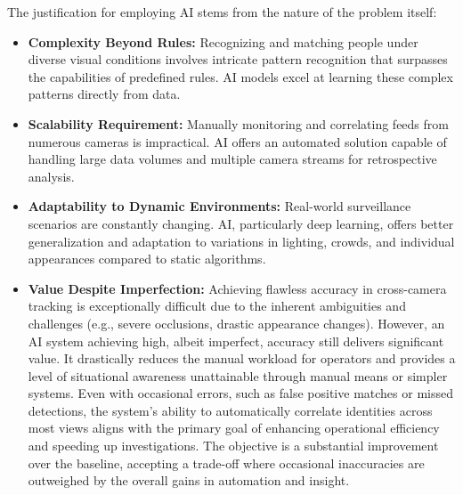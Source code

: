 \clearpage %
The justification for employing AI stems from the nature of the problem itself:
\begin{itemize}
    \item \textbf{Complexity Beyond Rules:} Recognizing and matching people under diverse visual conditions involves intricate pattern recognition that surpasses the capabilities of predefined rules. AI models excel at learning these complex patterns directly from data.
    \item \textbf{Scalability Requirement:} Manually monitoring and correlating feeds from numerous cameras is impractical. AI offers an automated solution capable of handling large data volumes and multiple camera streams for retrospective analysis.
    \item \textbf{Adaptability to Dynamic Environments:} Real-world surveillance scenarios are constantly changing. AI, particularly deep learning, offers better generalization and adaptation to variations in lighting, crowds, and individual appearances compared to static algorithms.
    \item \textbf{Value Despite Imperfection:} Achieving flawless accuracy in cross-camera tracking is exceptionally difficult due to the inherent ambiguities and challenges (e.g., severe occlusions, drastic appearance changes). However, an AI system achieving high, albeit imperfect, accuracy still delivers significant value. It drastically reduces the manual workload for operators and provides a level of situational awareness unattainable through manual means or simpler systems. Even with occasional errors, such as false positive matches or missed detections, the system's ability to automatically correlate identities across most views aligns with the primary goal of enhancing operational efficiency and speeding up investigations. The objective is a substantial improvement over the baseline, accepting a trade-off where occasional inaccuracies are outweighed by the overall gains in automation and insight.
\end{itemize}


